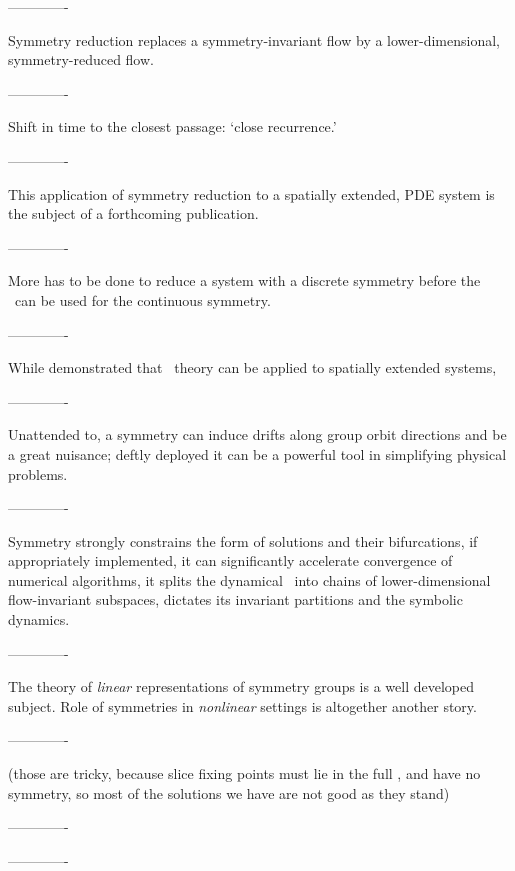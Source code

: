 -------------

Symmetry reduction replaces a symmetry-invariant flow by a
lower-dimensional, symmetry-reduced flow.

-------------

Shift in time to the closest passage:
`close recurrence.'

-------------

This application of symmetry reduction to a spatially extended, PDE
system is the subject of a forthcoming publication.

-------------

More has to be done to reduce a system with a discrete
symmetry before the \mslices\ can be used for the continuous symmetry.

-------------

While  demonstrated that \po\ theory can be
applied to spatially extended systems,

-------------

Unattended to, a symmetry can induce drifts along group orbit directions
and be a great nuisance; deftly deployed
it can be a powerful tool in simplifying physical problems.

-------------

Symmetry strongly constrains the form of solutions and their
bifurcations, if appropriately implemented, it can significantly
accelerate convergence of numerical algorithms, it splits the dynamical
\statesp\ into chains of lower-dimensional flow-invariant subspaces,
dictates its invariant partitions and the symbolic dynamics.

-------------

The theory of \emph{linear} representations of symmetry groups is
a well developed subject. Role of symmetries in
\emph{nonlinear} settings is altogether another story.

-------------

 (those are tricky, because slice fixing points
must lie in the full \statesp, and have no symmetry, so most of the
solutions we have are not good as they stand)

-------------

-------------
